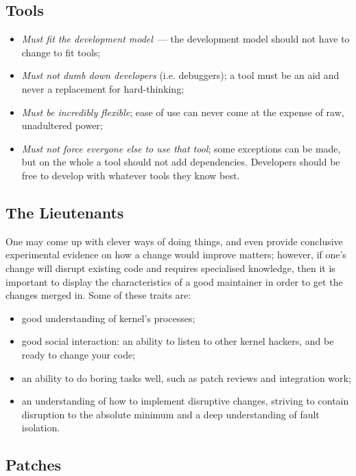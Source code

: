 \documentclass{book}
\begin{document}
\subsection{Tools}

\begin{itemize}
\item \emph{Must fit the development model}~--- the development model
  should not have to change to fit tools;
\item \emph{Must not dumb down developers} (i.e. debuggers); a tool
  must be an aid and never a replacement for hard-thinking;
\item \emph{Must be incredibly flexible}; ease of use can never come
  at the expense of raw, unadultered power;
\item \emph{Must not force everyone else to use that tool}; some
  exceptions can be made, but on the whole a tool should not add
  dependencies. Developers should be free to develop with whatever
  tools they know best.
\end{itemize}

\subsection{The Lieutenants}

One may come up with clever ways of doing things, and even provide
conclusive experimental evidence on how a change would improve
matters; however, if one's change will disrupt existing code and
requires specialised knowledge, then it is important to display the
characteristics of a good maintainer in order to get the changes
merged in. Some of these traits are:

\begin{itemize}
\item good understanding of kernel's processes;
\item good social interaction: an ability to listen to other kernel
  hackers, and be ready to change your code;
\item an ability to do boring tasks well, such as patch reviews and
  integration work;
\item an understanding of how to implement disruptive changes,
  striving to contain disruption to the absolute minimum and a deep
  understanding of fault isolation.
\end{itemize}

\subsection{Patches}
\end{document}
